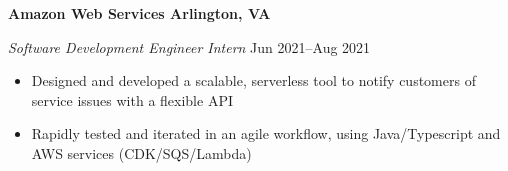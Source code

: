 \textbf{Amazon Web Services \hfill Arlington, VA}\par

\textit{Software Development Engineer Intern} \hfill Jun 2021--Aug 2021
\begin{itemize}
	\item Designed and developed a scalable, serverless tool to notify customers of service issues with a flexible API
	\item Rapidly tested and iterated in an agile workflow, using Java/Typescript and AWS services (CDK/SQS/Lambda)
\end{itemize}\par